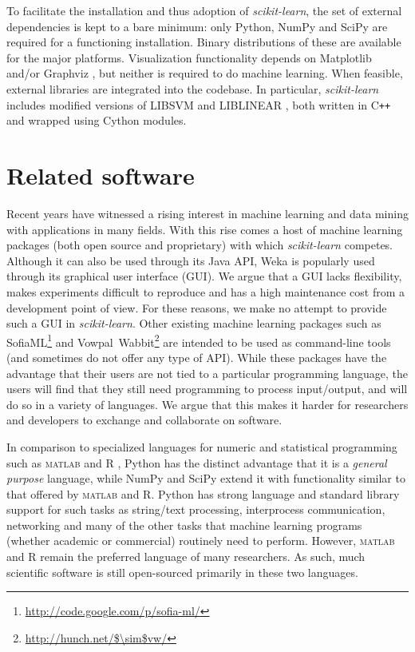 \documentclass{llncs}
\newcommand{\sklearn}{\textit{scikit-learn}\xspace}
\begin{document}
To facilitate the installation and thus adoption of \sklearn,
the set of external dependencies is kept to a bare minimum:
only Python, NumPy and SciPy are required for a functioning installation.
Binary distributions of these are available for the major platforms.
Visualization functionality depends on Matplotlib \citep{hunter2007matplotlib}
and/or Graphviz \citep{gansner2000},
but neither is required to do machine learning.
When feasible, external libraries are integrated into the codebase.
In particular, \sklearn includes modified versions of \textsf{LIBSVM} and \textsf{LIBLINEAR}
\citep{chang2011libsvm,fan2008}, both written in C{}\verb!++!
and wrapped using Cython modules.

\section{Related software}
\label{sec:comparison}


Recent years have witnessed a rising interest in machine learning and data mining
with applications in many fields.
With this rise comes a host of machine learning packages
(both open source and proprietary) with which \sklearn competes.
Although it can also be used through its Java API, Weka \citep{hall2009weka} is
popularly used through its graphical user interface (GUI). We argue that a GUI
lacks flexibility, makes experiments difficult to reproduce and has a high
maintenance cost from a development point of view. For these reasons, we make no
attempt to provide such a GUI in \sklearn.
Other existing machine learning packages 
such as SofiaML\footnote{\url{http://code.google.com/p/sofia-ml/}}
and Vowpal~Wabbit\footnote{\url{http://hunch.net/$\sim$vw/}}
are intended to be used as command-line tools
(and sometimes do not offer any type of API).
While these packages have the advantage
that their users are not tied to a particular programming language,
the users will find that they still need programming to process input/output,
and will do so in a variety of languages.
We argue that this makes it harder for researchers and developers
to exchange and collaborate on software.

In comparison to specialized languages for numeric and statistical programming
such as \textsc{matlab} and R \citep{r},
Python has the distinct advantage
that it is a \textit{general purpose} language,
while NumPy and SciPy extend it with functionality
similar to that offered by \textsc{matlab} and R.
Python has strong language and standard library support for such tasks as
string/text processing, interprocess communication, networking
and many of the other tasks that machine learning programs
(whether academic or commercial) routinely need to perform.
However, \textsc{matlab} and R remain the preferred language of many
researchers. As such, much scientific software is still open-sourced primarily
in these two languages.
\end{document}
